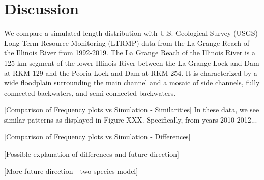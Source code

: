 \documentclass[preprint,review,12pt,authoryear]{elsarticle}
\begin{document}
\section{Discussion}


We compare a simulated length distribution with U.S. Geological Survey (USGS) Long-Term Resource Monitoring (LTRMP) data from the La Grange Reach of the Illinois River from 1992-2019. 
The La Grange Reach of the Illinois River is a 125 km segment of the lower Illinois River between the La Grange Lock and Dam at RKM 129 and the Peoria Lock and Dam at RKM 254. 
It is characterized by a wide floodplain surrounding the main channel and a mosaic of side channels, fully connected backwaters, and semi-connected backwaters.

[Comparison of Frequency plots vs Simulation - Similarities]
In these data, we see similar patterns as displayed in Figure XXX.  
Specifically, from years 2010-2012...


[Comparison of Frequency plots vs Simulation - Differences]

[Possible explanation of differences and future direction]


[More future direction - two species model]
\end{document}
